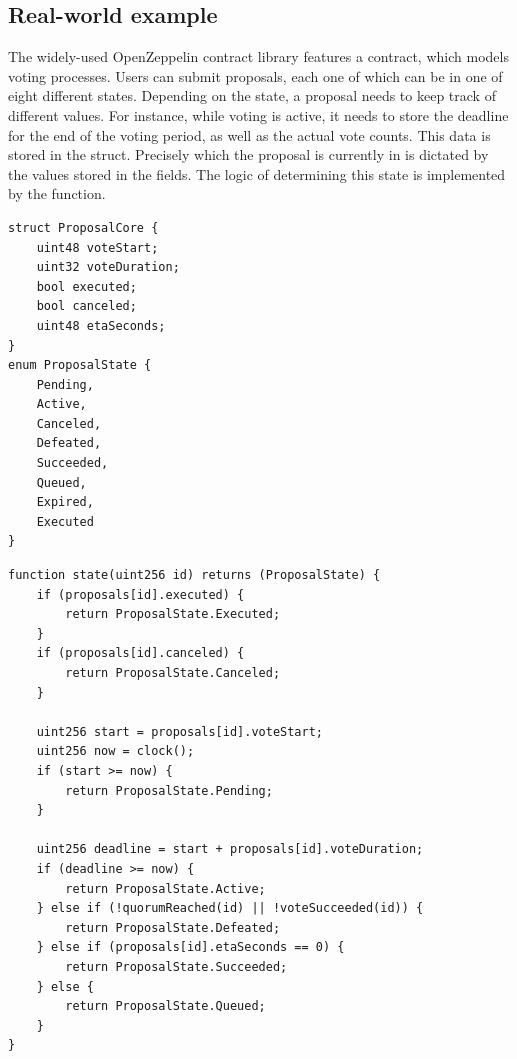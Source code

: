 \subsection{Real-world example}
The widely-used OpenZeppelin contract library features a  contract, which models voting processes. Users can submit proposals, each one of which can be in one of eight different states. Depending on the state, a proposal needs to keep track of different values. For instance, while voting is active, it needs to store the deadline for the end of the voting period, as well as the actual vote counts. This data is stored in the  struct. Precisely which  the proposal is currently in is dictated by the values stored in the fields. The logic of determining this state is implemented by the  function.
 
\noindent\begin{minipage}[t]{.3\textwidth}
\begin{lstlisting}[caption=Proposal State Data, language=Solidity, style=boxedSol, basicstyle=\ttfamily\small]
struct ProposalCore {
	uint48 voteStart;
	uint32 voteDuration;
	bool executed;
	bool canceled;
	uint48 etaSeconds;
}
enum ProposalState {
	Pending,
	Active,
	Canceled,
	Defeated,
	Succeeded,
	Queued,
	Expired,
	Executed
}
\end{lstlisting}
\end{minipage}
\begin{minipage}[t]{.7\textwidth}
\begin{lstlisting}[caption=Proposal State Logic, language=Solidity, style=boxedSol, basicstyle=\ttfamily\small]
function state(uint256 id) returns (ProposalState) {
	if (proposals[id].executed) {
		return ProposalState.Executed;
	}
	if (proposals[id].canceled) {
		return ProposalState.Canceled;
	}
	
	uint256 start = proposals[id].voteStart;
	uint256 now = clock();
	if (start >= now) {
		return ProposalState.Pending;
	}
	
	uint256 deadline = start + proposals[id].voteDuration;
	if (deadline >= now) {
		return ProposalState.Active;
	} else if (!quorumReached(id) || !voteSucceeded(id)) {
		return ProposalState.Defeated;
	} else if (proposals[id].etaSeconds == 0) {
		return ProposalState.Succeeded;
	} else {
		return ProposalState.Queued;
	}
}
\end{lstlisting}
\end{minipage}

